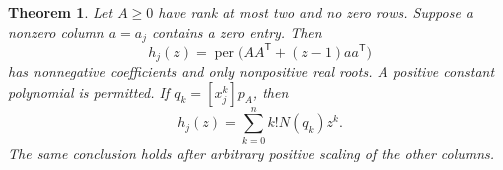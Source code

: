 \documentclass[11pt,a4paper]{article}
\newtheorem{theorem}{Theorem}[section]
\theoremstyle{definition}
\theoremstyle{remark}
\newcommand{\per}{\operatorname{per}}
\newcommand{\T}{\mathsf{T}}
\begin{document}
\begin{theorem}\label{thm:r2-collision-real-rooted}
Let $A\ge0$ have rank at most two and no zero rows.
Suppose a nonzero column $a=a_j$ contains a zero entry.
Then
\begin{equation}\label{eq:r2-collision-polynomial}
 h_j(z)=\per\bigl(AA^\T+(z-1)aa^\T\bigr)
\end{equation}
has nonnegative coefficients and only nonpositive real roots.
A positive constant polynomial is permitted.
If $q_k=[x_j^k]p_A$, then
\begin{equation}\label{eq:r2-collision-coefficients}
 h_j(z)=\sum_{k=0}^n k!N(q_k)z^k.
\end{equation}
The same conclusion holds after arbitrary positive scaling of the other columns.
\end{theorem}
\end{document}
